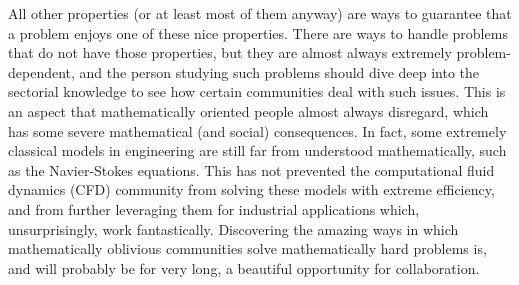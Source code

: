 All other properties (or at least most of them anyway) are ways to guarantee that a problem enjoys one of these nice properties. There are ways to handle problems that do not have those properties, but they are almost always extremely problem-dependent, and the person studying such problems should dive deep into the sectorial knowledge to see how certain communities deal with such issues. This is an aspect that mathematically oriented people almost always disregard, which has some severe mathematical (and social) consequences. In fact, some extremely classical models in engineering are still far from understood mathematically, such as the Navier-Stokes equations. This has not prevented the computational fluid dynamics (CFD) community from solving these models with extreme efficiency, and from further leveraging them for industrial applications which, unsurprisingly, work fantastically. Discovering the amazing ways in which mathematically oblivious communities solve mathematically hard problems is, and will probably be for very long, a beautiful opportunity for collaboration.


